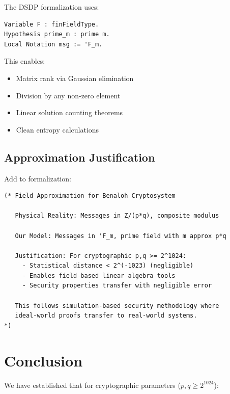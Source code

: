 \documentclass[11pt]{article}
\theoremstyle{definition}
\begin{document}
The DSDP formalization uses:
\begin{verbatim}
Variable F : finFieldType.
Hypothesis prime_m : prime m.
Local Notation msg := 'F_m.
\end{verbatim}

This enables:
\begin{itemize}
\item Matrix rank via Gaussian elimination
\item Division by any non-zero element
\item Linear solution counting theorems
\item Clean entropy calculations
\end{itemize}

\subsection{Approximation Justification}

Add to formalization:
\begin{verbatim}
(* Field Approximation for Benaloh Cryptosystem
   
   Physical Reality: Messages in Z/(p*q), composite modulus
   
   Our Model: Messages in 'F_m, prime field with m approx p*q
   
   Justification: For cryptographic p,q >= 2^1024:
     - Statistical distance < 2^(-1023) (negligible)
     - Enables field-based linear algebra tools
     - Security properties transfer with negligible error
     
   This follows simulation-based security methodology where
   ideal-world proofs transfer to real-world systems.
*)
\end{verbatim}

\section{Conclusion}

We have established that for cryptographic parameters ($p,q \geq 2^{1024}$):
\end{document}
